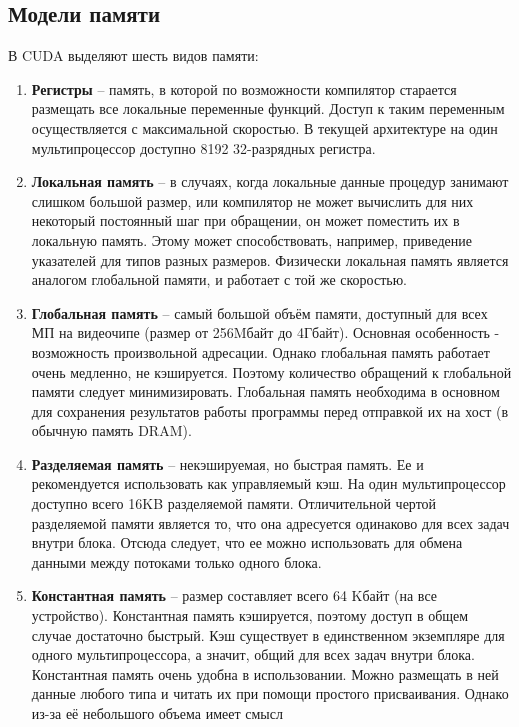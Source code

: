 \documentclass[a4paper, 12pt]{article}
\begin{document}
    \subsection{Модели памяти}
    В CUDA выделяют шесть видов памяти:
    \begin{enumerate}
        \item \textbf{Регистры} -- память, в которой по возможности компилятор старается размещать все локальные переменные функций. Доступ к 
    таким переменным осуществляется с максимальной скоростью. В текущей архитектуре на один 
    мультипроцессор доступно 8192 32-разрядных регистра. 
    \item \textbf{Локальная память} --  в случаях, когда локальные данные процедур занимают слишком большой размер, или компилятор не может 
    вычислить для них некоторый постоянный шаг при обращении, он может поместить их в локальную память. Этому может способствовать, например, приведение указателей для типов разных размеров. Физически локальная память является аналогом глобальной памяти, и работает с той же скоростью.
    \item \textbf{Глобальная память} -- самый большой объём памяти, доступный для всех МП на видеочипе (размер от 256Mбайт до 4Гбайт). Основная особенность -  возможность 
    произвольной адресации. Однако глобальная память работает очень медленно, не кэшируется. Поэтому количество обращений к глобальной памяти следует минимизировать. Глобальная память необходима в основном для сохранения результатов работы программы перед отправкой 
    их на хост (в обычную память DRAM). 
    \item \textbf{Разделяемая память} -- некэшируемая, но быстрая память. Ее и рекомендуется использовать как 
    управляемый кэш. На один мультипроцессор доступно всего 16KB разделяемой памяти. 
    Отличительной чертой разделяемой памяти является то, что она адресуется одинаково для всех задач 
    внутри блока. Отсюда следует, что ее можно использовать для обмена данными между потоками 
    только одного блока.
    \item \textbf{Константная память} --  размер 
    составляет всего 64 Kбайт (на все устройство). Константная память кэшируется, поэтому доступ в общем случае достаточно быстрый. Кэш существует в единственном экземпляре для одного мультипроцессора, а значит, общий для всех задач внутри блока. 
    Константная память очень удобна в использовании. Можно размещать в ней данные любого типа и читать их 
    при помощи простого присваивания. Однако из-за её небольшого объема имеет смысл 

\end{enumerate}
\end{document}
